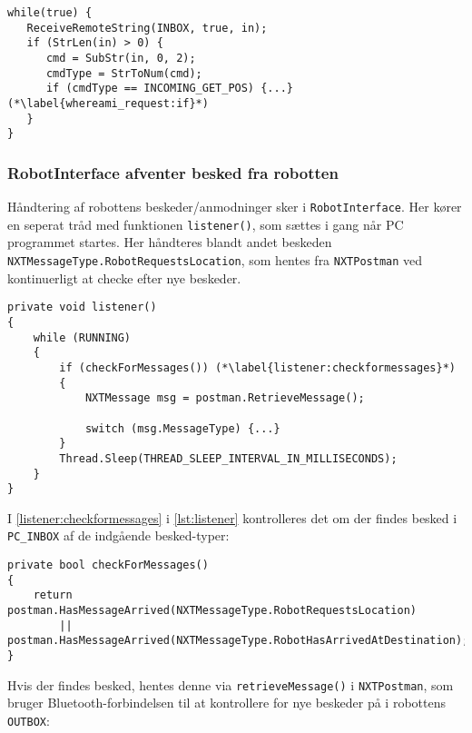 \begin{lstlisting}[style=csmall,label=lst:whereami_response,caption=Robotten venter på svar]
while(true) {
   ReceiveRemoteString(INBOX, true, in);
   if (StrLen(in) > 0) {
      cmd = SubStr(in, 0, 2);
      cmdType = StrToNum(cmd);
      if (cmdType == INCOMING_GET_POS) {...} (*\label{whereami_request:if}*)
   }
}
\end{lstlisting}

\subsubsection{RobotInterface afventer besked fra robotten}
Håndtering af robottens beskeder/anmodninger sker i \lstinline[style=csharp]!RobotInterface!.
Her kører en seperat tråd med funktionen \lstinline[style=csharp]!listener()!, som sættes i gang når PC programmet startes.
Her håndteres blandt andet beskeden \lstinline[style=csharp]!NXTMessageType.RobotRequestsLocation!, som hentes fra \lstinline[style=csharp]!NXTPostman! ved kontinuerligt at checke efter nye beskeder.

\begin{lstlisting}[style=csharpsmall,label=lst:listener,caption=listener() i RobotInterface]
private void listener()
{
    while (RUNNING)
    {
        if (checkForMessages()) (*\label{listener:checkformessages}*)
        {
            NXTMessage msg = postman.RetrieveMessage();

            switch (msg.MessageType) {...}
        }
        Thread.Sleep(THREAD_SLEEP_INTERVAL_IN_MILLISECONDS);
    }
}
\end{lstlisting}

I \cref{listener:checkformessages} i \cref{lst:listener} kontrolleres det om der findes besked i \lstinline[style=csharp]!PC_INBOX! af de indgående besked-typer:

\begin{lstlisting}[style=csharpsmall,label=lst:checkformessages,caption=checkForMessages() i RobotInterface]
private bool checkForMessages()
{
    return postman.HasMessageArrived(NXTMessageType.RobotRequestsLocation)
        || postman.HasMessageArrived(NXTMessageType.RobotHasArrivedAtDestination);
}
\end{lstlisting}

Hvis der findes besked, hentes denne via \lstinline[style=csharp]!retrieveMessage()! i \lstinline[style=csharp]!NXTPostman!, som bruger Bluetooth-forbindelsen til at kontrollere for nye beskeder på i robottens \lstinline[style=c]!OUTBOX!:

